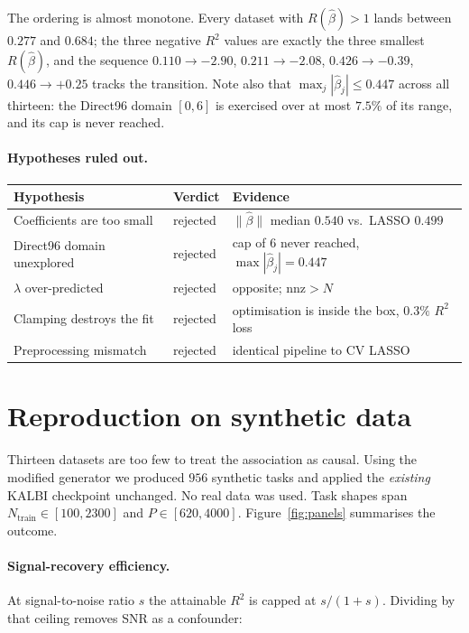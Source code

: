 \documentclass[11pt]{article}
\newcommand{\bhat}{\hat{\beta}}
\begin{document}
The ordering is almost monotone. Every dataset with $R(\bhat) > 1$ lands
between $0.277$ and $0.684$; the three negative $R^2$ values are exactly the
three smallest $R(\bhat)$, and the sequence
$0.110 \to -2.90$, $0.211 \to -2.08$, $0.426 \to -0.39$, $0.446 \to +0.25$
tracks the transition. Note also that
$\max_j |\bhat_j| \le 0.447$ across all thirteen: the Direct96 domain
$[0,6]$ is exercised over at most $7.5\%$ of its range, and its cap is never
reached.

\paragraph{Hypotheses ruled out.}

\begin{table}[h]
\centering
\begin{tabular}{@{}lll@{}}
\toprule
Hypothesis & Verdict & Evidence \\
\midrule
Coefficients are too small & rejected & $\|\bhat\|$ median $0.540$ vs.\ LASSO $0.499$ \\
Direct96 domain unexplored & rejected & cap of 6 never reached, $\max|\bhat_j| = 0.447$ \\
$\lambda$ over-predicted & rejected & opposite; $\mathrm{nnz} > N$ \\
Clamping destroys the fit & rejected & optimisation is inside the box, $0.3\%$ $R^2$ loss \\
Preprocessing mismatch & rejected & identical pipeline to CV LASSO \\
\bottomrule
\end{tabular}
\end{table}

\section{Reproduction on synthetic data}

Thirteen datasets are too few to treat the association as causal. Using the
modified generator we produced $956$ synthetic tasks and applied the
\emph{existing} KALBI checkpoint unchanged. No real data was used.
Task shapes span $N_{\mathrm{train}} \in [100, 2300]$ and $P \in [620, 4000]$.
Figure~\ref{fig:panels} summarises the outcome.

\paragraph{Signal-recovery efficiency.}
At signal-to-noise ratio $s$ the attainable $R^2$ is capped at $s/(1+s)$.
Dividing by that ceiling removes SNR as a confounder:
\end{document}
